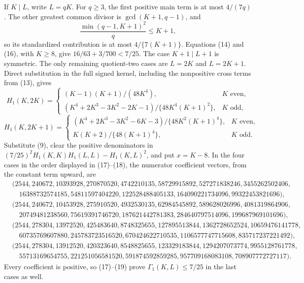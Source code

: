 If \(K\mid L\), write \(L=qK\).  For \(q\geq3\), the first positive main term is at most \(4/(7q)\).  The other greatest common divisor is \(\gcd(K+1,q-1)\), and
\[
 \frac{\min(q-1,K+1)^2}{q}\leq K+1,                                            \tag{16}
\]
so its standardized contribution is at most \(4/\{7(K+1)\}\).  Equations (14) and (16), with \(K\geq8\), give \(16/63+3/700<7/25\).  The case \(K+1\mid L+1\) is symmetric.  The only remaining quotient-two cases are \(L=2K\) and \(L=2K+1\).  Direct substitution in the full signed kernel, including the nonpositive cross terms from (13), gives
\[
 H_1(K,2K)=
 \begin{cases}
 (K-1)(K+1)/(48K^4),&K\text{ even},\\
 (K^4+2K^3-3K^2-2K-1)/\{48K^4(K+1)^2\},&K\text{ odd},
 \end{cases}                                                                    \tag{17}
\]
\[
 H_1(K,2K+1)=
 \begin{cases}
 (K^4+2K^3-3K^2-6K-3)/\{48K^2(K+1)^4\},&K\text{ even},\\
 K(K+2)/\{48(K+1)^4\},&K\text{ odd}.
 \end{cases}                                                                    \tag{18}
\]
Substitute (9), clear the positive denominators in
\((7/25)^2H_1(K,K)H_1(L,L)-H_1(K,L)^2\), and put \(x=K-8\).  In the four cases in the order displayed in (17)--(18), the numerator coefficient vectors, from the constant term upward, are
\[
\begin{split}
 &(2544,240672,10393928,270870520,4742210135,58729915892,527271838246,3455262502406,\\
 &\quad16388732574185,54811597404220,122528488405133,164090221734096,99322453821696),\\
 &(2544,240672,10453928,275910520,4932530135,62984545892,589628026996,4081319864906,\\
 &\quad20749481238560,75619391746720,187621442781383,284640797514096,199687969101696),\\
 &(2544,278304,13972520,425483640,8748325655,127895513844,1362728652524,10659476141778,\\
 &\quad60735769607880,245783723516520,670424622710535,1106577747715608,835717237221492),\\
 &(2544,278304,13912520,420323640,8548825655,123329183844,1294207073774,9955128761778,\\
 &\quad55713169654755,221251056581520,591874592859285,957709168083108,708907772727117).
\end{split}                                                                      \tag{19}
\]
Every coefficient is positive, so (17)--(19) prove \(\Gamma_1(K,L)\leq7/25\) in the last cases as well.

